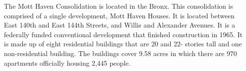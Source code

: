 The Mott Haven Consolidation is located in the Bronx. This consolidation is comprised of a single development, Mott Haven Houses. It is located between East 140th and East 144th Streets, and Willis and Alexander Avenues. It is a federally funded conventional development that finished construction in 1965. It is made up of eight residential buildings that are 20 and 22- stories tall and one non-residential building. The buildings cover 9.58 acres in which there are 970 apartments officially housing 2,445 people.